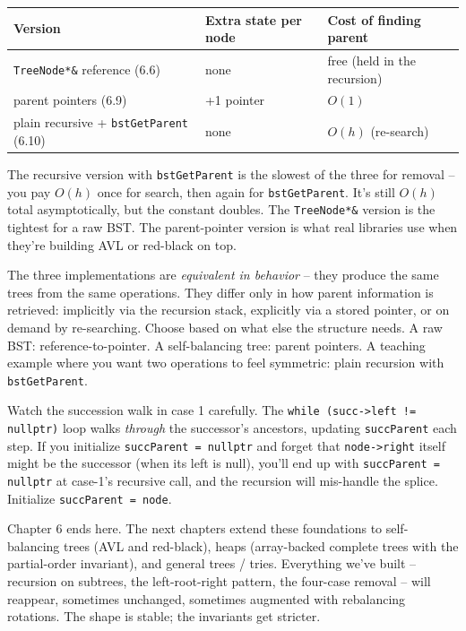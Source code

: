 \documentclass[11pt]{article}
\begin{document}
\begin{center}
\begin{tabular}{lll}
Version & Extra state per node & Cost of finding parent \\
\hline
\texttt{TreeNode*\&} reference (6.6) & none & free (held in the recursion) \\
parent pointers (6.9)                 & +1 pointer & $O(1)$ \\
plain recursive + \texttt{bstGetParent} (6.10) & none & $O(h)$ (re-search) \\
\end{tabular}
\end{center}

The recursive version with \texttt{bstGetParent} is the slowest of the three for removal -- you pay $O(h)$ once for search, then again for \texttt{bstGetParent}. It's still $O(h)$ total asymptotically, but the constant doubles. The \texttt{TreeNode*\&} version is the tightest for a raw BST. The parent-pointer version is what real libraries use when they're building AVL or red-black on top.

\begin{ideabox}
The three implementations are \emph{equivalent in behavior} -- they produce the same trees from the same operations. They differ only in how parent information is retrieved: implicitly via the recursion stack, explicitly via a stored pointer, or on demand by re-searching. Choose based on what else the structure needs. A raw BST: reference-to-pointer. A self-balancing tree: parent pointers. A teaching example where you want two operations to feel symmetric: plain recursion with \texttt{bstGetParent}.
\end{ideabox}

\begin{warnbox}
Watch the succession walk in case 1 carefully. The \texttt{while (succ->left != nullptr)} loop walks \emph{through} the successor's ancestors, updating \texttt{succParent} each step. If you initialize \texttt{succParent = nullptr} and forget that \texttt{node->right} itself might be the successor (when its left is null), you'll end up with \texttt{succParent = nullptr} at case-1's recursive call, and the recursion will mis-handle the splice. Initialize \texttt{succParent = node}.
\end{warnbox}

\begin{notebox}
Chapter 6 ends here. The next chapters extend these foundations to self-balancing trees (AVL and red-black), heaps (array-backed complete trees with the partial-order invariant), and general trees / tries. Everything we've built -- recursion on subtrees, the left-root-right pattern, the four-case removal -- will reappear, sometimes unchanged, sometimes augmented with rebalancing rotations. The shape is stable; the invariants get stricter.
\end{notebox}
\end{document}

